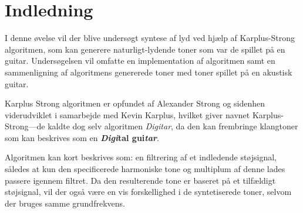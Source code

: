 \section{Indledning}

I denne øvelse vil der blive undersøgt syntese af lyd ved hjælp af Karplus-Strong algoritmen, som kan generere naturligt-lydende toner som var de spillet på en guitar.
Undersøgelsen vil omfatte en implementation af algoritmen samt en sammenligning af algoritmens genererede toner med toner spillet på en akustisk guitar.

Karplus Strong algoritmen er opfundet af Alexander Strong og sidenhen viderudviklet i samarbejde med Kevin Karplus\cite{Karplus1983}, hvilket giver navnet Karplus-Strong---de kaldte dog selv algoritmen \emph{Digitar}, da den kan frembringe klangtoner som kan beskrives som en \textbf{\emph{Digi}tal gui\emph{tar}}.

Algoritmen kan kort beskrives som: en filtrering af et indledende støjsignal, således at kun den specificerede harmoniske tone og multiplum af denne lades passere igennem filtret.
Da den resulterende tone er baseret på et tilfældigt støjsignal, vil der også være en vis forskellighed i de syntetiserede toner, selvom der bruges samme grundfrekvens.
